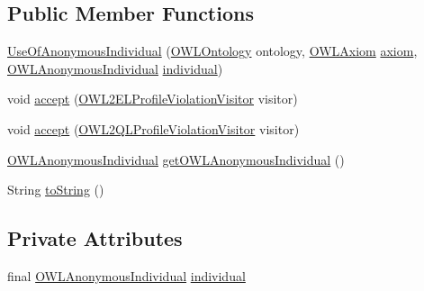 \subsection*{Public Member Functions}
\begin{DoxyCompactItemize}
\item 
\hyperlink{classorg_1_1semanticweb_1_1owlapi_1_1profiles_1_1_use_of_anonymous_individual_acb2134fd6b6879cdcce30941137c8b2f}{Use\-Of\-Anonymous\-Individual} (\hyperlink{interfaceorg_1_1semanticweb_1_1owlapi_1_1model_1_1_o_w_l_ontology}{O\-W\-L\-Ontology} ontology, \hyperlink{interfaceorg_1_1semanticweb_1_1owlapi_1_1model_1_1_o_w_l_axiom}{O\-W\-L\-Axiom} \hyperlink{classorg_1_1semanticweb_1_1owlapi_1_1profiles_1_1_o_w_l_profile_violation_aa7c8e8910ed3966f64a2c003fb516214}{axiom}, \hyperlink{interfaceorg_1_1semanticweb_1_1owlapi_1_1model_1_1_o_w_l_anonymous_individual}{O\-W\-L\-Anonymous\-Individual} \hyperlink{classorg_1_1semanticweb_1_1owlapi_1_1profiles_1_1_use_of_anonymous_individual_ab1776000138a3cb75e2b106a19a9c5f2}{individual})
\item 
void \hyperlink{classorg_1_1semanticweb_1_1owlapi_1_1profiles_1_1_use_of_anonymous_individual_ab03814cc2bf452ca4f7047dfea2275e8}{accept} (\hyperlink{interfaceorg_1_1semanticweb_1_1owlapi_1_1profiles_1_1_o_w_l2_e_l_profile_violation_visitor}{O\-W\-L2\-E\-L\-Profile\-Violation\-Visitor} visitor)
\item 
void \hyperlink{classorg_1_1semanticweb_1_1owlapi_1_1profiles_1_1_use_of_anonymous_individual_aa101ff69a3f83afe794b756ca66c719d}{accept} (\hyperlink{interfaceorg_1_1semanticweb_1_1owlapi_1_1profiles_1_1_o_w_l2_q_l_profile_violation_visitor}{O\-W\-L2\-Q\-L\-Profile\-Violation\-Visitor} visitor)
\item 
\hyperlink{interfaceorg_1_1semanticweb_1_1owlapi_1_1model_1_1_o_w_l_anonymous_individual}{O\-W\-L\-Anonymous\-Individual} \hyperlink{classorg_1_1semanticweb_1_1owlapi_1_1profiles_1_1_use_of_anonymous_individual_a71a8cb5e5cd2692008fbd6ad4f295174}{get\-O\-W\-L\-Anonymous\-Individual} ()
\item 
String \hyperlink{classorg_1_1semanticweb_1_1owlapi_1_1profiles_1_1_use_of_anonymous_individual_a89516704c0fdb1c8ba2c14c317e171b6}{to\-String} ()
\end{DoxyCompactItemize}
\subsection*{Private Attributes}
\begin{DoxyCompactItemize}
\item 
final \hyperlink{interfaceorg_1_1semanticweb_1_1owlapi_1_1model_1_1_o_w_l_anonymous_individual}{O\-W\-L\-Anonymous\-Individual} \hyperlink{classorg_1_1semanticweb_1_1owlapi_1_1profiles_1_1_use_of_anonymous_individual_ab1776000138a3cb75e2b106a19a9c5f2}{individual}
\end{DoxyCompactItemize}


